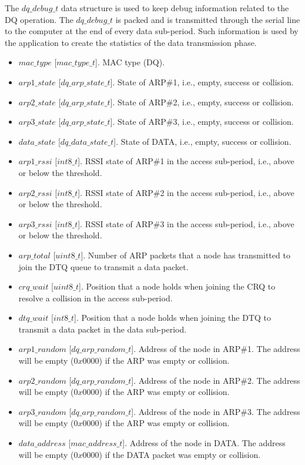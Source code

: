 The $dq\_debug\_t$ data structure is used to keep debug information related to the DQ operation. The $dq\_debug\_t$ is packed and is transmitted through the serial line to the computer at the end of every data sub-period. Such information is used by the application to create the statistics of the data transmission phase.
\begin{itemize}
\item $mac\_type$ [$mac\_type\_t$]. MAC type (DQ).

\item $arp1\_state$ [$dq\_arp\_state\_t$]. State of ARP\#1, i.e., empty, success or collision.
\item $arp2\_state$ [$dq\_arp\_state\_t$]. State of ARP\#2, i.e., empty, success or collision.
\item $arp3\_state$ [$dq\_arp\_state\_t$]. State of ARP\#3, i.e., empty, success or collision.
\item $data\_state$ [$dq\_data\_state\_t$]. State of DATA, i.e., empty, success or collision.

\item $arp1\_rssi$ [$int8\_t$]. RSSI state of ARP\#1 in the access sub-period, i.e., above or below the threshold.
\item $arp2\_rssi$ [$int8\_t$]. RSSI state of ARP\#2 in the access sub-period, i.e., above or below the threshold.
\item $arp3\_rssi$ [$int8\_t$]. RSSI state of ARP\#3 in the access sub-period, i.e., above or below the threshold.

\item $arp\_total$ [$uint8\_t$]. Number of ARP packets that a node has transmitted to join the DTQ queue to transmit a data packet.
\item $crq\_wait$ [$uint8\_t$]. Position that a node holds when joining the CRQ to resolve a collision in the access sub-period.
\item $dtq\_wait$ [$int8\_t$]. Position that a node holds when joining the DTQ to transmit a data packet in the data sub-period.

\item $arp1\_random$ [$dq\_arp\_random\_t$]. Address of the node in ARP\#1. The address will be empty ($0x0000$) if the ARP was empty or collision.
\item $arp2\_random$ [$dq\_arp\_random\_t$]. Address of the node in ARP\#2. The address will be empty ($0x0000$) if the ARP was empty or collision.
\item $arp3\_random$ [$dq\_arp\_random\_t$]. Address of the node in ARP\#3. The address will be empty ($0x0000$) if the ARP was empty or collision.
\item $data\_address$ [$mac\_address\_t$]. Address of the node in DATA. The address will be empty ($0x0000$) if the DATA packet was empty or collision.


\end{itemize}
